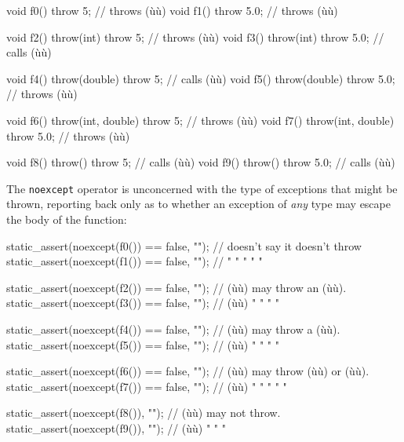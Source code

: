 \begin{emcppslisting}[emcppsbatch=e3]
void f0()                    { throw 5;   }  // throws (ù{}ù)
void f1()                    { throw 5.0; }  // throws (ù{}ù)

void f2() throw(int)         { throw 5;   }  // throws (ù{}ù)
void f3() throw(int)         { throw 5.0; }  // calls (ù{}ù)

void f4() throw(double)      { throw 5;   }  // calls (ù{}ù)
void f5() throw(double)      { throw 5.0; }  // throws (ù{}ù)

void f6() throw(int, double) { throw 5;   }  // throws (ù{}ù)
void f7() throw(int, double) { throw 5.0; }  // throws (ù{}ù)

void f8() throw()            { throw 5;   }  // calls (ù{}ù)
void f9() throw()            { throw 5.0; }  // calls (ù{}ù)
\end{emcppslisting}
    

\noindent The \lstinline!noexcept! operator is unconcerned with the type of
exceptions that might be thrown, reporting back only as to whether an
exception of \emph{any} type may escape the body of the function:

\begin{emcppslisting}[emcppsbatch=e3]
static_assert(noexcept(f0()) == false, "");  // doesn't say it doesn't throw
static_assert(noexcept(f1()) == false, "");  //   "      "   "    "      "

static_assert(noexcept(f2()) == false, "");  // (ù{}ù) may throw an (ù{}ù).
static_assert(noexcept(f3()) == false, "");  // (ù{}ù)  "    "    "   "

static_assert(noexcept(f4()) == false, "");  // (ù{}ù) may throw a (ù{}ù).
static_assert(noexcept(f5()) == false, "");  // (ù{}ù)  "    "   "    "

static_assert(noexcept(f6()) == false, "");  // (ù{}ù) may throw (ù{}ù) or (ù{}ù).
static_assert(noexcept(f7()) == false, "");  // (ù{}ù)  "    "     "    "    "

static_assert(noexcept(f8()), "");   // (ù{}ù) may not throw.
static_assert(noexcept(f9()), "");   // (ù{}ù)  "    "     "
\end{emcppslisting}
    

